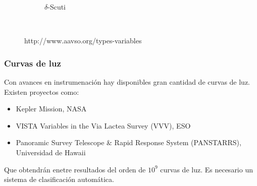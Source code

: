 \documentclass{beamer}
\begin{document}
\begin{frame}
\begin{figure}
\begin{subfigure}[b]{0.4\textwidth}
      \caption{$\delta$-Scuti}
      \label{fig:tiger}
    \end{subfigure}
    ~ %
    \caption{http://www.aavso.org/types-variables}\label{fig:animals}
  \end{figure}

\end{frame}

\begin{frame}
  \frametitle{Curvas de luz}
  Con avances en instrumenación hay disponibles gran cantidad de curvas de luz. Existen proyectos como:
  \begin{itemize}
  \item Kepler Mission, NASA
  \item VISTA Variables in the Via Lactea Survey (VVV), ESO
  \item Panoramic Survey Telescope \& Rapid Response System (PANSTARRS), Universidad de Hawaii
  \end{itemize}
  Que obtendrán enetre resultados del orden de $10^9$ curvas de luz. Es necesario un sistema de clasificación automática.
\end{frame}
\end{document}
